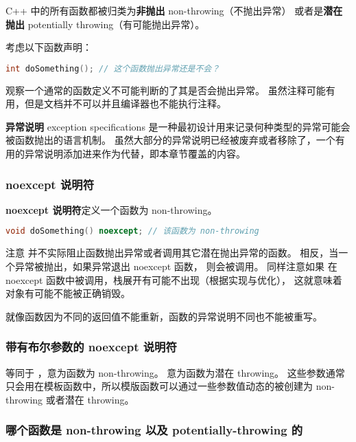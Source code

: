 \documentclass[../../LearnCpp.tex]{subfiles}
\begin{document}

C++ 中的所有函数都被归类为\textbf{非抛出} non-throwing（不抛出异常）
或者是\textbf{潜在抛出} potentially throwing（有可能抛出异常）。

考虑以下函数声明：

\begin{lstlisting}[language=C++]
int doSomething(); // 这个函数抛出异常还是不会？
\end{lstlisting}

观察一个通常的函数定义不可能判断的了其是否会抛出异常。
虽然注释可能有用，但是文档并不可以并且编译器也不能执行注释。

\textbf{异常说明} exception specifications 是一种最初设计用来记录何种类型的异常可能会被函数抛出的语言机制。
虽然大部分的异常说明已经被废弃或者移除了，一个有用的异常说明添加进来作为代替，即本章节覆盖的内容。

\subsubsection*{noexcept 说明符}

\textbf{noexcept 说明符}定义一个函数为 non-throwing。

\begin{lstlisting}[language=C++]
void doSomething() noexcept; // 该函数为 non-throwing
\end{lstlisting}

注意  并不实际阻止函数抛出异常或者调用其它潜在抛出异常的函数。
相反，当一个异常被抛出，如果异常退出 noexcept 函数， 则会被调用。
同样注意如果  在 noexcept 函数中被调用，栈展开有可能不出现（根据实现与优化），
这就意味着对象有可能不能被正确销毁。

就像函数因为不同的返回值不能重新，函数的异常说明不同也不能被重写。

\subsubsection*{带有布尔参数的 noexcept 说明符}

 等同于 ，意为函数为 non-throwing。
 意为函数为潜在 throwing。
这些参数通常只会用在模板函数中，所以模版函数可以通过一些参数值动态的被创建为 non-throwing 或者潜在 throwing。

\subsubsection*{哪个函数是 non-throwing 以及 potentially-throwing 的}
\end{document}
